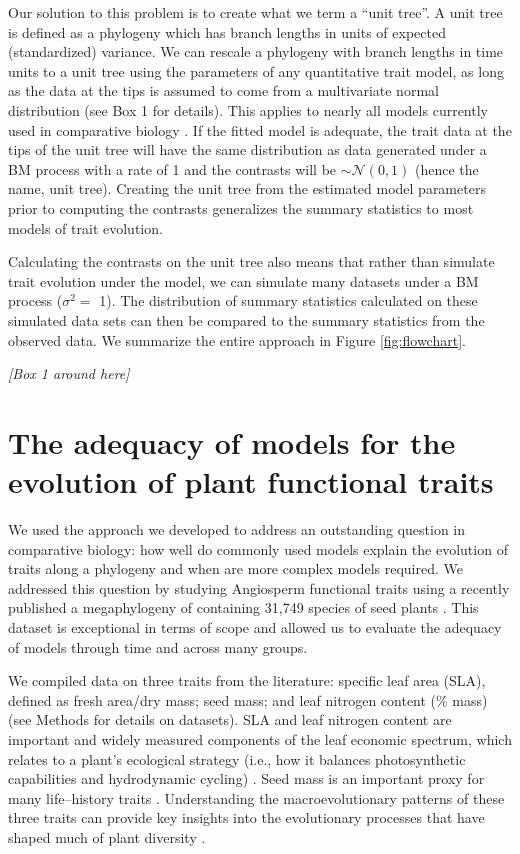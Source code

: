 \documentclass[a4paper,12pt]{article}
\begin{document}
Our solution to this problem is to create what we term a ``unit tree''. A unit tree is defined as a phylogeny which has branch lengths in units of expected (standardized) variance. We can rescale a phylogeny with branch lengths in time units to a unit tree using the parameters of any quantitative trait model, as long as the data at the tips is assumed to come from a multivariate normal distribution (see Box 1 for details). This applies to nearly all models currently used in comparative biology \citep{Omeara2012}. If the fitted model is adequate, the trait data at the tips of the unit tree will have the same distribution as data generated under a BM process with a rate of 1 and the contrasts will be $\sim \mathcal{N}(0,1)$ (hence the name, unit tree). Creating the unit tree from the estimated model parameters prior to computing the contrasts generalizes the summary statistics to most models of trait evolution.

Calculating the contrasts on the unit tree also means that rather than simulate trait evolution under the model, we can simulate many datasets under a BM process ($\sigma^2 =$ 1). The distribution of summary statistics calculated on these simulated data sets can then be compared to the summary statistics from the observed data. We summarize the entire approach in Figure \ref{fig:flowchart}.

\begin{center}
\textit{[Box 1 around here]}
\end{center}

\section{The adequacy of models for the evolution of plant functional traits}

We used the approach we developed to address an outstanding question in comparative biology: how well do commonly used models explain the evolution of traits along a phylogeny and when are more complex models required. We addressed this question by studying Angiosperm functional traits using a recently published a megaphylogeny of containing 31,749 species of seed plants \citep{Zanne2013}. This dataset is exceptional in terms of scope and allowed us to evaluate the adequacy of models through time and across many groups.  

We compiled data on three traits from the literature: specific leaf area (SLA), defined as fresh area/dry mass; seed mass; and leaf nitrogen content (\% mass) (see Methods for details on datasets). SLA and leaf nitrogen content are important and widely measured components of the leaf economic spectrum, which relates to a plant's ecological strategy (i.e., how it balances photosynthetic capabilities and hydrodynamic cycling) \citep{Westoby2002, Wright2004}. Seed mass is an important proxy for many life--history traits \citep{Westoby2002, Moles2005}. Understanding the macroevolutionary patterns of these three traits can provide key insights into the evolutionary processes that have shaped much of plant diversity \citep{ksi}.  
\end{document}
